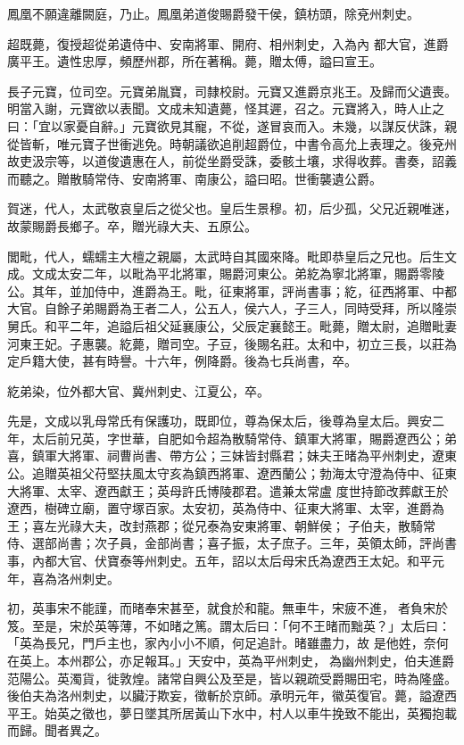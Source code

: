 \begin{pinyinscope}
 鳳凰不願違離闕庭，乃止。鳳凰弟道俊賜爵發干侯，鎮枋頭，除兗州刺史。



 超既薨，復授超從弟遺侍中、安南將軍、開府、相州刺史，入為內
 都大官，進爵廣平王。遺性忠厚，頻歷州郡，所在著稱。薨，贈太傅，謚曰宣王。



 長子元寶，位司空。元寶弟胤寶，司隸校尉。元寶又進爵京兆王。及歸而父遺喪。明當入謝，元寶欲以表聞。文成未知遺薨，怪其遲，召之。元寶將入，時人止之曰：「宜以家憂自辭。」元寶欲見其寵，不從，遂冒哀而入。未幾，以謀反伏誅，親從皆斬，唯元寶子世衝逃免。時朝議欲追削超爵位，中書令高允上表理之。後兗州故吏汲宗等，以道俊遺惠在人，前從坐爵受誅，委骸土壤，求得收葬。書奏，詔義而聽之。贈散騎常侍、安南將軍、南康公，謚曰昭。世衝襲遺公爵。



 賀迷，代人，太武敬哀皇后之從父也。皇后生景穆。初，后少孤，父兄近親唯迷，故蒙賜爵長鄉子。卒，贈光祿大夫、五原公。



 閭毗，代人，蠕蠕主大檀之親屬，太武時自其國來降。毗即恭皇后之兄也。后生文成。文成太安二年，以毗為平北將軍，賜爵河東公。弟紇為寧北將軍，賜爵零陵公。其年，並加侍中，進爵為王。毗，征東將軍，評尚書事；紇，征西將軍、中都大官。自餘子弟賜爵為王者二人，公五人，侯六人，子三人，同時受拜，所以隆崇舅氏。和平二年，追謚后祖父延襄康公，父辰定襄懿王。毗薨，贈太尉，追贈毗妻
 河東王妃。子惠襲。紇薨，贈司空。子豆，後賜名莊。太和中，初立三長，以莊為定戶籍大使，甚有時譽。十六年，例降爵。後為七兵尚書，卒。



 紇弟染，位外都大官、冀州刺史、江夏公，卒。



 先是，文成以乳母常氏有保護功，既即位，尊為保太后，後尊為皇太后。興安二年，太后前兄英，字世華，自肥如令超為散騎常侍、鎮軍大將軍，賜爵遼西公；弟喜，鎮軍大將軍、祠曹尚書、帶方公；三妹皆封縣君；妹夫王暏為平州刺史，遼東公。追贈英祖父苻堅扶風太守亥為鎮西將軍、遼西蘭公；勃海太守澄為侍中、征東大將軍、太宰、遼西獻王；英母許氏博陵郡君。遣兼太常盧
 度世持節改葬獻王於遼西，樹碑立廟，置守塚百家。太安初，英為侍中、征東大將軍、太宰，進爵為王；喜左光祿大夫，改封燕郡；從兄泰為安東將軍、朝鮮侯；子伯夫，散騎常侍、選部尚書；次子員，金部尚書；喜子振，太子庶子。三年，英領太師，評尚書事，內都大官、伏寶泰等州刺史。五年，詔以太后母宋氏為遼西王太妃。和平元年，喜為洛州刺史。



 初，英事宋不能謹，而暏奉宋甚至，就食於和龍。無車牛，宋疲不進，者負宋於笈。至是，宋於英等薄，不如暏之篤。謂太后曰：「何不王暏而黜英？」太后曰：「英為長兄，門戶主也，家內小小不順，何足追計。暏雖盡力，故
 是他姓，奈何在英上。本州郡公，亦足報耳。」天安中，英為平州刺史，為幽州刺史，伯夫進爵范陽公。英濁貨，徙敦煌。諸常自興公及至是，皆以親疏受爵賜田宅，時為隆盛。後伯夫為洛州刺史，以臟汙欺妄，徵斬於京師。承明元年，徽英復官。薨，謚遼西平王。始英之徵也，夢日墜其所居黃山下水中，村人以車牛挽致不能出，英獨抱載而歸。聞者異之。




\end{pinyinscope}
